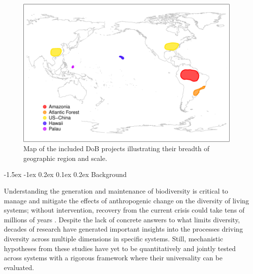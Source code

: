 \documentclass[11pt]{article}
\makeatletter
\renewcommand\subsection{\@startsection{subsection}{1}{\z@}%
                                  {-1.5ex \@plus -1ex \@minus 0.2ex}%
                                  {0.1ex \@plus 0.2ex}%
                                  {\normalfont\large\bfseries}}
\makeatother
\begin{document}
\begin{figure}
  \label{fig:map} 
  \vspace{-10pt}
  \begin{center}
    \includegraphics[width=1\textwidth]{../fig_map.pdf}
  \end{center}
  \vspace{-10pt}
  \caption{Map of the included DoB projects illustrating their breadth of
geographic region and scale.}
\vspace{-10pt}
\end{figure}


\subsection{Background}\label{background}

Understanding the generation and maintenance of biodiversity is critical
to manage and mitigate the effects of anthropogenic change on the
diversity of living systems; without intervention, recovery from the
current crisis \cite{Barnosky2011-ww} could take tens of millions of
years \cite{Erwin2015-yb}. Despite the lack of concrete answers to what
limits diversity, decades of research have generated important insights
into the processes driving diversity across multiple dimensions in
specific systems. Still, mechanistic hypotheses from these studies have
yet to be quantitatively and jointly tested across systems with a
rigorous framework where their universality can be evaluated.
\end{document}
